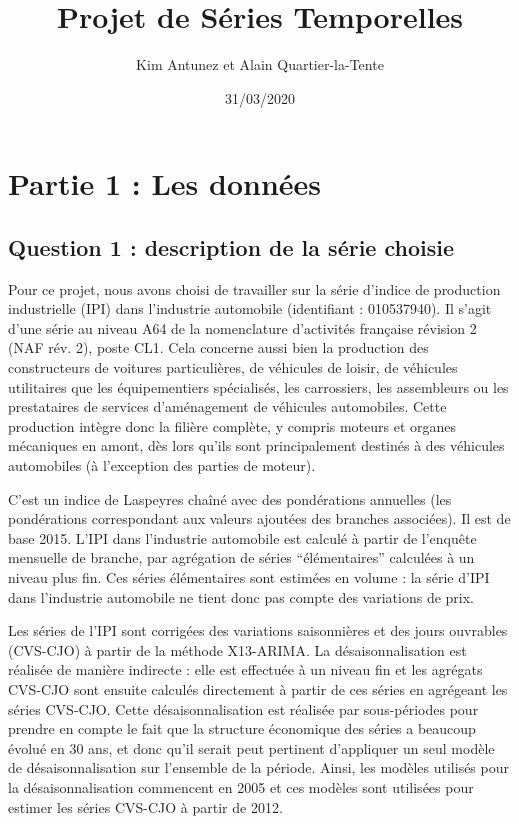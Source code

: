 \documentclass[]{article}
\title{Projet de Séries Temporelles}
\author{Kim Antunez et Alain Quartier-la-Tente}
\date{31/03/2020}
\begin{document}
\maketitle

{
\hypersetup{linkcolor=}
\setcounter{tocdepth}{3}
\tableofcontents
}
\hypertarget{partie-1-les-donnuxe9es}{%
\section{Partie 1 : Les données}\label{partie-1-les-donnuxe9es}}

\hypertarget{question-1-description-de-la-suxe9rie-choisie}{%
\subsection{Question 1 : description de la série choisie}\label{question-1-description-de-la-suxe9rie-choisie}}

Pour ce projet, nous avons choisi de travailler sur la série d'indice de production industrielle (IPI) dans l'industrie automobile (identifiant : 010537940).
Il s'agit d'une série au niveau A64 de la nomenclature d'activités française révision 2 (NAF rév. 2), poste CL1.
Cela concerne aussi bien la production des constructeurs de voitures particulières, de véhicules de loisir, de véhicules utilitaires que les équipementiers spécialisés, les carrossiers, les assembleurs ou les prestataires de services d'aménagement de véhicules automobiles.
Cette production intègre donc la filière complète, y compris moteurs et organes mécaniques en amont, dès lors qu'ils sont principalement destinés à des véhicules automobiles (à l'exception des parties de moteur).

C'est un indice de Laspeyres chaîné avec des pondérations annuelles (les pondérations correspondant aux valeurs ajoutées des branches associées).
Il est de base 2015.
L'IPI dans l'industrie automobile est calculé à partir de l'enquête mensuelle de branche, par agrégation de séries ``élémentaires'' calculées à un niveau plus fin.
Ces séries élémentaires sont estimées en volume : la série d'IPI dans l'industrie automobile ne tient donc pas compte des variations de prix.

Les séries de l'IPI sont corrigées des variations saisonnières et des jours ouvrables (CVS-CJO) à partir de la méthode X13-ARIMA.
La désaisonnalisation est réalisée de manière indirecte : elle est effectuée à un niveau fin et les agrégats CVS-CJO sont ensuite calculés directement à partir de ces séries en agrégeant les séries CVS-CJO.
Cette désaisonnalisation est réalisée par sous-périodes pour prendre en compte le fait que la structure économique des séries a beaucoup évolué en 30 ans, et donc qu'il serait peut pertinent d'appliquer un seul modèle de désaisonnalisation sur l'ensemble de la période.
Ainsi, les modèles utilisés pour la désaisonnalisation commencent en 2005 et ces modèles sont utilisées pour estimer les séries CVS-CJO à partir de 2012.
\end{document}
